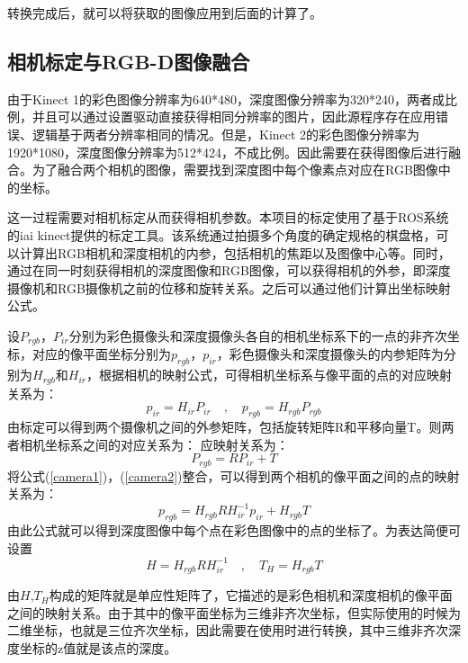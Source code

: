 转换完成后，就可以将获取的图像应用到后面的计算了。

\subsection{相机标定与RGB-D图像融合}
由于Kinect 1的彩色图像分辨率为640*480，深度图像分辨率为320*240，两者成比例，并且可以通过设置驱动直接获得相同分辨率的图片，因此源程序存在应用错误、逻辑基于两者分辨率相同的情况。但是，Kinect 2的彩色图像分辨率为1920*1080，深度图像分辨率为512*424，不成比例。因此需要在获得图像后进行融合。为了融合两个相机的图像，需要找到深度图中每个像素点对应在RGB图像中的坐标。

这一过程需要对相机标定从而获得相机参数。本项目的标定使用了基于ROS系统的iai kinect提供的标定工具\cite{iai_kinect2}。该系统通过拍摄多个角度的确定规格的棋盘格，可以计算出RGB相机和深度相机的内参，包括相机的焦距以及图像中心等。同时，通过在同一时刻获得相机的深度图像和RGB图像，可以获得相机的外参，即深度摄像机和RGB摄像机之前的位移和旋转关系。之后可以通过他们计算出坐标映射公式。

设$P_{rgb}$，$P_{ir}$分别为彩色摄像头和深度摄像头各自的相机坐标系下的一点的非齐次坐标，对应的像平面坐标分别为$p_{rgb}$，$p_{ir}$，彩色摄像头和深度摄像头的内参矩阵为分别为$H_{rgb}$和$H_{ir}$，根据相机的映射公式，可得相机坐标系与像平面的点的对应映射关系为：
\begin{equation}
 p_{ir} = H_{ir}P_{ir} \quad\mathrm{,}\quad  p_{rgb} = H_{rgb}P_{rgb}\label{camera1}
\end{equation}
由标定可以得到两个摄像机之间的外参矩阵，包括旋转矩阵R和平移向量T。则两者相机坐标系之间的对应关系为：
应映射关系为：
\begin{equation}
 P_{rgb} = RP_{ir} + T \label{camera2}
\end{equation}
将公式(\ref{camera1})，(\ref{camera2})整合，可以得到两个相机的像平面之间的点的映射关系为：
\begin{equation}
 p_{rgb} = H_{rgb}RH_{ir}^{-1}p_{ir} + H_{rgb}T
\end{equation}
由此公式就可以得到深度图像中每个点在彩色图像中的点的坐标了。为表达简便可设置
\begin{equation}
 H = H_{rgb}RH_{ir}^{-1} \quad\mathrm{,}\quad T_H = H_{rgb}T
\end{equation}

由$H$,$T_H$构成的矩阵就是单应性矩阵了，它描述的是彩色相机和深度相机的像平面之间的映射关系。由于其中的像平面坐标为三维非齐次坐标，但实际使用的时候为二维坐标，也就是三位齐次坐标，因此需要在使用时进行转换，其中三维非齐次深度坐标的z值就是该点的深度。
	
